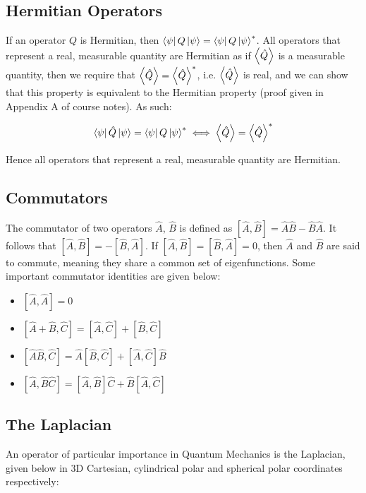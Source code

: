 \subsection{Hermitian Operators}

If an operator $Q$ is Hermitian, then $\bra{\psi}Q\ket{\psi} = \bra{\psi}Q\ket{\psi}^*$. All operators that represent a real, measurable quantity are Hermitian as if $\expval{\hat{Q}}$ is a measurable quantity, then we require that $\expval{\hat{Q}} = \expval{\hat{Q}}^*$, i.e. $\expval{\hat{Q}}$ is real, and we can show that this property is equivalent to the Hermitian property (proof given in Appendix A of course notes). As such:

\[ \bra{\psi}\hat{Q}\ket{\psi} =  \bra{\psi}Q\ket{\psi}^* \iff \expval{\hat{Q}} = \expval{\hat{Q}}^* \]

Hence all operators that represent a real, measurable quantity are Hermitian. 

\subsection{Commutators}

The commutator of two operators $\hat{A}$, $\hat{B}$ is defined as $[\hat{A},\hat{B}] = \hat{A}\hat{B} - \hat{B}\hat{A}$. It follows that $[\hat{A},\hat{B}] = -[\hat{B},\hat{A}]$. If $[\hat{A},\hat{B}] =[\hat{B},\hat{A}] = 0$, then $\hat{A}$ and $\hat{B}$ are said to commute, meaning they share a common set of eigenfunctions.  Some important commutator identities are given below:

\begin{itemize}
	\item $[\hat{A},\hat{A}] = 0$
	\item $[\hat{A} + \hat{B}, \hat{C}] = [\hat{A},\hat{C}] + [\hat{B},\hat{C}]$
	\item $[\hat{A}\hat{B},\hat{C}] = \hat{A}[\hat{B},\hat{C}] + [\hat{A},\hat{C}]\hat{B}$
	\item $[\hat{A},\hat{B}\hat{C}] = [\hat{A},\hat{B}]\hat{C} + \hat{B}[\hat{A},\hat{C}]$
\end{itemize}

\subsection{The Laplacian}

An operator of particular importance in Quantum Mechanics is the Laplacian, given below in 3D Cartesian, cylindrical polar and spherical polar coordinates respectively:

